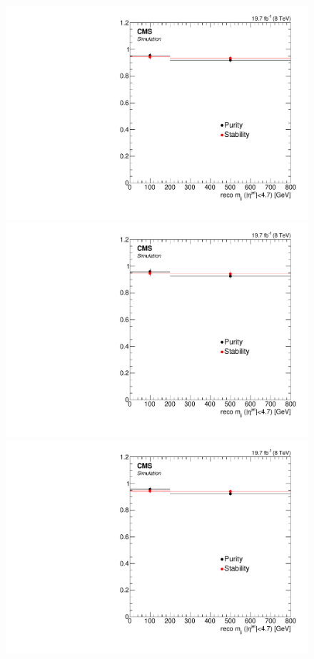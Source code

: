 \begin{figure}[hbtp]
  \begin{center}
    \includegraphics[width=0.8\cmsFigWidth]{Figures/Unfolding/BinMigration/PurityStability_4m_Mjj_Mad}
    \includegraphics[width=0.8\cmsFigWidth]{Figures/Unfolding/BinMigration/PurityStability_4e_Mjj_Mad}
    \includegraphics[width=0.8\cmsFigWidth]{Figures/Unfolding/BinMigration/PurityStability_2e2m_Mjj_Mad}

\end{center}
\end{figure}
